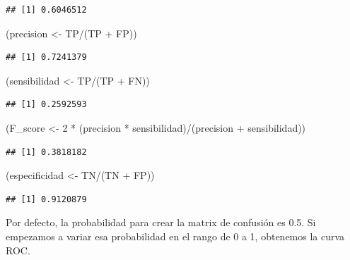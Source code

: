 \documentclass[
  12pt,
]{book}
\newenvironment{Shaded}{\begin{snugshade}}{\end{snugshade}}
\newcommand{\DecValTok}[1]{\textcolor[rgb]{0.00,0.00,0.81}{#1}}
\newcommand{\NormalTok}[1]{#1}
\newcommand{\OtherTok}[1]{\textcolor[rgb]{0.56,0.35,0.01}{#1}}
\newcommand{\SpecialCharTok}[1]{\textcolor[rgb]{0.00,0.00,0.00}{#1}}
\theoremstyle{definition}
\theoremstyle{definition}
\theoremstyle{definition}
\theoremstyle{definition}
\theoremstyle{remark}
\begin{document}
\begin{verbatim}
## [1] 0.6046512
\end{verbatim}

\begin{Shaded}
\begin{Highlighting}[]
\NormalTok{(precision }\OtherTok{\textless{}{-}}\NormalTok{ TP}\SpecialCharTok{/}\NormalTok{(TP }\SpecialCharTok{+}\NormalTok{ FP))}
\end{Highlighting}
\end{Shaded}

\begin{verbatim}
## [1] 0.7241379
\end{verbatim}

\begin{Shaded}
\begin{Highlighting}[]
\NormalTok{(sensibilidad }\OtherTok{\textless{}{-}}\NormalTok{ TP}\SpecialCharTok{/}\NormalTok{(TP }\SpecialCharTok{+}\NormalTok{ FN))}
\end{Highlighting}
\end{Shaded}

\begin{verbatim}
## [1] 0.2592593
\end{verbatim}

\begin{Shaded}
\begin{Highlighting}[]
\NormalTok{(F\_score }\OtherTok{\textless{}{-}} \DecValTok{2} \SpecialCharTok{*}\NormalTok{ (precision }\SpecialCharTok{*}\NormalTok{ sensibilidad)}\SpecialCharTok{/}\NormalTok{(precision }\SpecialCharTok{+}
\NormalTok{    sensibilidad))}
\end{Highlighting}
\end{Shaded}

\begin{verbatim}
## [1] 0.3818182
\end{verbatim}

\begin{Shaded}
\begin{Highlighting}[]
\NormalTok{(especificidad }\OtherTok{\textless{}{-}}\NormalTok{ TN}\SpecialCharTok{/}\NormalTok{(TN }\SpecialCharTok{+}\NormalTok{ FP))}
\end{Highlighting}
\end{Shaded}

\begin{verbatim}
## [1] 0.9120879
\end{verbatim}

Por defecto, la probabilidad para crear la matrix de confusión es 0.5. Si empezamos a variar esa probabilidad en el rango de 0 a 1, obtenemos la curva ROC.
\end{document}
